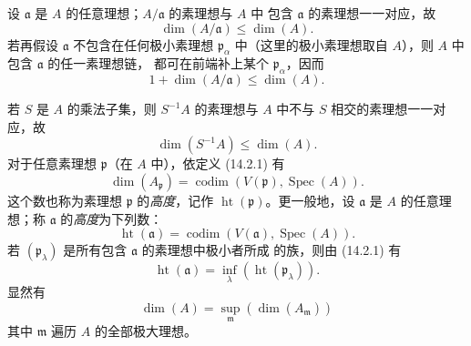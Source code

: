 \begin{env}[16.1.2]
\label{0.16.1.2-fr}
设 $\mathfrak{a}$ 是 $A$ 的任意理想；$A/\mathfrak{a}$ 的素理想与 $A$ 中
包含 $\mathfrak{a}$ 的素理想一一对应，故
\[
\label{0.16.1.2.1-fr}
  \dim(A/\mathfrak{a})\leq\dim(A).
\tag{16.1.2.1}
\]
若再假设 $\mathfrak{a}$ 不包含在任何极小素理想
$\mathfrak{p}_\alpha$ 中（这里的极小素理想取自 $A$），则 $A$ 中包含
$\mathfrak{a}$ 的任一素理想链，
都可在前端补上某个 $\mathfrak{p}_\alpha$，因而
\[
\label{0.16.1.2.2-fr}
  1+\dim(A/\mathfrak{a})\leq\dim(A).
\tag{16.1.2.2}
\]
\end{env}

\begin{env}[16.1.3]
\label{0.16.1.3-fr}
若 $S$ 是 $A$ 的乘法子集，则 $S^{-1}A$ 的素理想与 $A$ 中不与 $S$
相交的素理想一一对应，故
\[
\label{0.16.1.3.1-fr}
  \dim(S^{-1}A)\leq\dim(A).
\tag{16.1.3.1}
\]
对于任意素理想 $\mathfrak{p}$（在 $A$ 中），依定义 (14.2.1) 有
\[
\label{0.16.1.3.2-fr}
  \dim(A_{\mathfrak{p}})
  =\operatorname{codim}(V(\mathfrak{p}),\operatorname{Spec}(A)).
\tag{16.1.3.2}
\]
这个数也称为素理想 $\mathfrak{p}$ 的\emph{高度}，记作
$\operatorname{ht}(\mathfrak{p})$。更一般地，设 $\mathfrak{a}$ 是 $A$
的任意理想；称 $\mathfrak{a}$ 的\emph{高度}为下列数：
\[
\label{0.16.1.3.3-fr}
  \operatorname{ht}(\mathfrak{a})
  =\operatorname{codim}(V(\mathfrak{a}),\operatorname{Spec}(A)).
\tag{16.1.3.3}
\]
若 $(\mathfrak{p}_\lambda)$ 是所有包含 $\mathfrak{a}$ 的素理想中极小者所成
的族，则由 (14.2.1) 有
\[
\label{0.16.1.3.4-fr}
  \operatorname{ht}(\mathfrak{a})
  =\inf_\lambda(\operatorname{ht}(\mathfrak{p}_\lambda)).
\tag{16.1.3.4}
\]
显然有
\[
\label{0.16.1.3.5-fr}
  \dim(A)=\sup_{\mathfrak{m}}(\dim(A_{\mathfrak{m}}))
\tag{16.1.3.5}
\]
其中 $\mathfrak{m}$ 遍历 $A$ 的全部极大理想。
\end{env}

